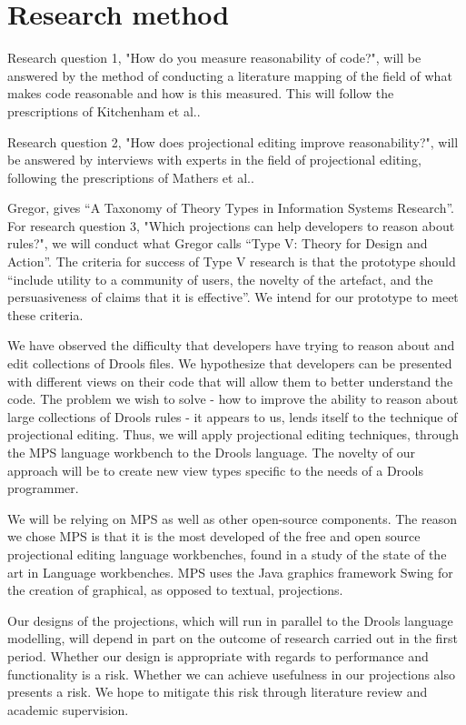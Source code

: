 \section{Research method} 

Research question 1, "How do you measure reasonability of code?", will be answered by the method of conducting a literature mapping of the field of what makes code reasonable and how is this measured. 
This will follow the prescriptions of Kitchenham et al.\cite{kitchenham2015evidence}.

Research question 2, "How does projectional editing improve reasonability?", will be answered by interviews with experts in the field of projectional editing, following the prescriptions of Mathers et al.\cite{mathers1998using}.

Gregor\cite{gregor2006nature}, gives “A Taxonomy of Theory Types in Information Systems Research”. 
For research question 3, "Which projections can help developers to reason about rules?", we will conduct what Gregor calls “Type V: Theory for Design and Action”. 
The criteria for success of Type V research is that the prototype should “include utility to a community of users, the novelty of the artefact, and the persuasiveness of claims that it is effective”.
We intend for our prototype to meet these criteria.

We have observed the difficulty that developers have trying to reason about and edit collections of Drools files.
We hypothesize that developers can be presented with different views on their code that will allow them to better understand the code.
The problem we wish to solve - how to improve the ability to reason about large collections of Drools rules - it appears to us, lends itself to the technique of projectional editing.
Thus, we will apply projectional editing techniques, through the MPS language workbench to the Drools language.
The novelty of our approach will be to create new view types specific to the needs of a Drools programmer.

We will be relying on MPS as well as other open-source components.
The reason we chose MPS is that it is the most developed of the free and open source projectional editing language workbenches, found in a study of the state of the art in Language workbenches\cite{erdweg2013state}.
MPS uses the Java graphics framework Swing for the creation of graphical, as opposed to textual, projections.

Our designs of the projections, which will run in parallel to the Drools language modelling, will depend in part on the outcome of research carried out in the first period.
Whether our design is appropriate with regards to performance and functionality is a risk. 
Whether we can achieve usefulness in our projections also presents a risk.
We hope to mitigate this risk through literature review and academic supervision.

